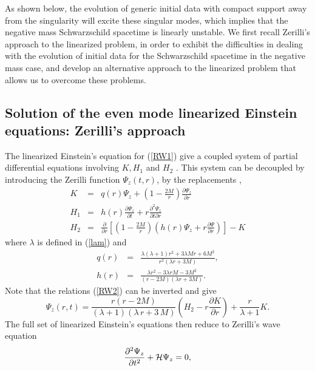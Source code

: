 \documentclass[aps,floats,showpacs,amssymb,tightenlines]{revtex4}
\begin{document}
 As shown below, the evolution of generic initial data  with compact support away 
from the singularity will excite these singular modes, which implies that  the negative mass 
Schwarzschild spacetime
is linearly unstable. We first recall Zerilli's approach to the linearized problem, 
in order to exhibit
the difficulties in dealing with the evolution of initial data for the Schwarzschild spacetime 
in the negative mass case, and develop
an alternative approach to the linearized problem that allows us to overcome these problems.



\subsection{Solution of the even mode linearized Einstein equations: Zerilli's approach}
The linearized Einstein's equation for (\ref{RW1}) give a coupled system of partial differential equations
involving $K, H_1$ and $H_2$ \cite{rw}. This system
  can be  decoupled by introducing
the Zerilli function $\Psi_z(t,r)$, by the replacements \cite{zerilli},
\begin{eqnarray}
\label{RW2}
K & = & q(r) \Psi_z+\left(1-\frac{2M}{r}\right)\frac{\partial \Psi_z}{\partial r} \nonumber \\
H_1 & = & h(r)\frac{\partial \Psi_z}{\partial t}+r\frac{\partial^2 \Psi_z}{\partial t \partial r}
 \\
H_2 & = & \frac{\partial }{\partial r}\left[\left(1-\frac{2M}{r}\right)\left(h(r) \Psi_z
+r\frac{\partial \Psi}{ \partial r} \right)\right] -K  \nonumber
\end{eqnarray}
where $\lambda$ is defined in (\ref{lam}) and
\begin{eqnarray}
\label{RW2a}
q(r) & = &  \frac{\lambda(\lambda+1)r^2+3 \lambda M r + 6 M^2}{r^2(\lambda r + 3 M)}, \\
h(r) & = &  \frac{\lambda r^2 - 3 \lambda r M -3 M^2}{(r-2M)(\lambda r + 3M)}.\nonumber
\end{eqnarray}
Note that the  relations (\ref{RW2}) can be inverted and give
\begin{equation}
\label{zeri}
\Psi_z(r,t)  = \frac {r (r-2M)}{ ( \lambda+1 )  ( \lambda
\,r+3\,M ) } \left(H_2
 - r  \frac {\partial K}{\partial r}
\right)
    +\frac{r}{\lambda+1} K.
\end{equation}
The full set of linearized Einstein's equations then reduce to Zerilli's wave equation
\begin{equation}
\label{zerilli}
\frac{\partial^2 \Psi_z}{\partial t^2}+{\cal H} \Psi_z = 0,
\end{equation}
\end{document}
